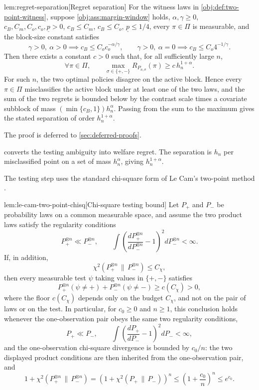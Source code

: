 \documentclass[11pt]{article}
\begin{document}
\begin{lemmav}{lem:regret-separation}[Regret separation]
For the witness laws in \cref{obj:def:two-point-witness}, suppose \cref{obj:ass:margin-window} holds, \(\alpha,\gamma\ge0\), \(c_B,C_m,C_o,c_o,\underline p>0\), \(c_B\le C_m\), \(c_B\le C_o\), \(\underline p\le 1/4\), every \(\pi\in\Pi\) is measurable, and the block-size constant satisfies
\[
\gamma>0,\ \alpha>0 \implies c_B\le C_o c_o^{-\alpha/\gamma},
\qquad
\gamma>0,\ \alpha=0 \implies c_B\le C_o 4^{-1/\gamma}.
\]
Then there exists a constant \(c>0\) such that, for all sufficiently large \(n\),
\[
\forall\pi\in\Pi,\qquad
\max_{\sigma\in\{+,-\}}
R_{P_{n,\sigma}}(\pi)
\ge
c\,h_n^{1+\alpha}.
\]
For such \(n\), the two optimal policies disagree on the active block. Hence every \(\pi\in\Pi\) misclassifies the active block under at least one of the two laws, and the sum of the two regrets is bounded below by the contrast scale times a covariate subblock of mass \((\min\{c_B,1\})h_n^\alpha\). Passing from the sum to the maximum gives the stated separation of order \(h_n^{1+\alpha}\).
\end{lemmav}

The proof is deferred to \cref{sec:deferred-proofs}.

 converts the testing ambiguity into welfare regret.  The separation is \(h_n\) per misclassified point on a set of mass \(h_n^\alpha\), giving \(h_n^{1+\alpha}\).

The testing step uses the standard chi-square form of Le Cam's two-point method \citep{LeCam1986,Tsybakov2009}.

\begin{lemmav}{lem:le-cam-two-point-chisq}[Chi-square testing bound]
Let \(P_+\) and \(P_-\) be probability laws on a common measurable space, and assume the two product laws satisfy the regularity conditions
\[
P_+^{\otimes n}\ll P_-^{\otimes n},
\qquad
\int \left(\frac{dP_+^{\otimes n}}{dP_-^{\otimes n}}-1\right)^2
  dP_-^{\otimes n}<\infty.
\]
If, in addition,
\[
\chi^2(P_+^{\otimes n}\,\|\,P_-^{\otimes n})\le C_\chi,
\]
then every measurable test \(\psi\) taking values in \(\{+,-\}\) satisfies
\[
P_+^{\otimes n}(\psi\ne +)
+
P_-^{\otimes n}(\psi\ne -)
\ge
c(C_\chi)>0,
\]
where the floor \(c(C_\chi)\) depends only on the budget \(C_\chi\), and not on the pair of laws or on the test.
In particular, for \(c_0\ge 0\) and \(n\ge 1\), this conclusion holds whenever the one-observation pair obeys the same two regularity conditions,
\[
P_+\ll P_-,
\qquad
\int \left(\frac{dP_+}{dP_-}-1\right)^2 dP_-<\infty,
\]
and the one-observation chi-square divergence is bounded by \(c_0/n\): the two displayed product conditions are then inherited from the one-observation pair, and
\[
1+\chi^2(P_+^{\otimes n}\,\|\,P_-^{\otimes n})
=
\left(1+\chi^2(P_+\,\|\,P_-)\right)^n
\le
\left(1+\frac{c_0}{n}\right)^n
\le e^{c_0}.
\]
\end{lemmav}
\end{document}
